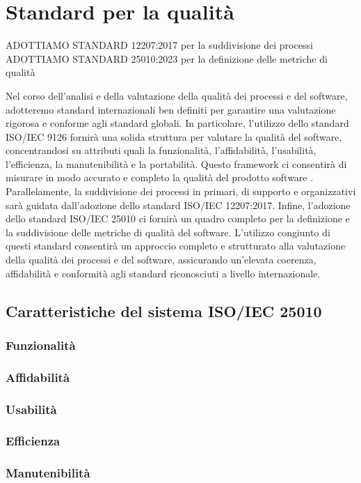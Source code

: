 \section{Standard per la qualità}

ADOTTIAMO STANDARD 12207:2017 per la suddivisione dei processi
ADOTTIAMO STANDARD 25010:2023 per la definizione delle metriche di qualità

Nel corso dell’analisi e della valutazione della qualità dei processi e del software, adotteremo standard internazionali ben definiti per garantire una valutazione rigorosa e conforme agli standard globali. In particolare, l’utilizzo dello standard ISO/IEC 9126 fornirà una solida struttura per valutare la qualità del software, concentrandosi su attributi quali la funzionalità, l’affidabilità, l’usabilità, l’efficienza, la manutenibilità e la portabilità. Questo framework ci consentirà di misurare in modo accurato e completo la qualità del prodotto software .
Parallelamente, la suddivisione dei processi in primari, di supporto e organizzativi sarà guidata dall’adozione dello standard ISO/IEC 12207:2017. Infine, l’adozione dello standard ISO/IEC 25010 ci fornirà un quadro completo per la definizione e la suddivisione delle metriche di qualità del software. L’utilizzo congiunto di questi standard consentirà un approccio completo e strutturato alla valutazione della qualità dei processi e del software, assicurando un’elevata coerenza, affidabilità e conformità agli standard riconosciuti a livello internazionale.
\subsection{Caratteristiche del sistema ISO/IEC 25010}
\subsubsection{Funzionalità}
\subsubsection{Affidabilità}
\subsubsection{Usabilità}
\subsubsection{Efficienza}
\subsubsection{Manutenibilità}
